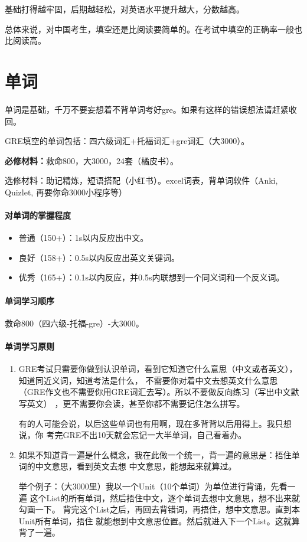 \documentclass[cn,plain]{elegantbookex}
\newenvironment{material}{\begin{tcolorbox}[title={材料}]}{\end{tcolorbox}}
\begin{document}
基础打得越牢固，后期越轻松，对英语水平提升越大，分数越高。

总体来说，对中国考生，填空还是比阅读要简单的。在考试中填空的正确率一般也比阅读高。

\section{单词}
单词是基础，千万不要妄想着不背单词考好gre。如果有这样的错误想法请赶紧收回。

GRE填空的单词包括：四六级词汇+托福词汇+gre词汇（大3000）。

\begin{material}
\textbf{必修材料：}救命800，大3000，24套（橘皮书）。

选修材料：助记精炼，短语搭配（小红书）。excel词表，背单词软件（Anki,
Quizlet, 再要你命3000小程序等）
\end{material}

\paragraph{对单词的掌握程度}
\begin{itemize}
\item 普通（150+）：1s以内反应出中文。
\item 良好（158+）：0.5s以内反应出英文关键词。
\item 优秀（165+）：0.1s以内反应，并0.5s内联想到一个同义词和一个反义词。
\end{itemize}

\paragraph{单词学习顺序}
救命800（四六级-托福-gre）-大3000。

\paragraph{单词学习原则}
\begin{enumerate}
\item GRE考试只需要你做到认识单词，看到它知道它什么意思（中文或者英文），知道同近义词，知道考法是什么，
不需要你对着中文去想英文什么意思（GRE作文也不需要你用GRE词汇去写）。所以不要做反向练习（写出中文默写英文）
，更不需要你会读，甚至你都不需要记住怎么拼写。

有的人可能会说，以后这些单词也有用啊，现在多背背以后用得上。我只想说，你
考完GRE不出10天就会忘记一大半单词，自己看着办。

\item 如果不知道背一遍是什么概念，我在此做一个统一，背一遍的意思是：捂住单词的中文意思，看到英文去想
中文意思，能想起来就算过。

举个例子：（大3000里）我以一个Unit（10个单词）为单位进行背诵，先看一遍
这个List的所有单词，然后捂住中文，逐个单词去想中文意思，想不出来就勾画一下。
背完这个List之后，再回去背错词，再捂住，想中文意思。直到本Unit所有单词，捂住
就能想到中文意思位置。然后就进入下一个List。这就算背了一遍。
\end{enumerate}
\end{document}
